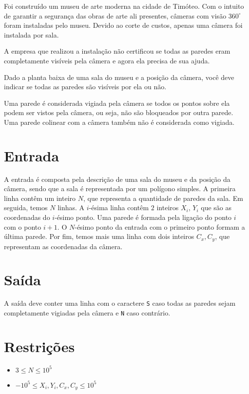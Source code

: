 Foi construído um museu de arte moderna na cidade de Timóteo. Com o intuito de garantir a segurança das obras
de arte ali presentes, câmeras com visão $360 ^{\circ}$ foram instaladas pelo museu.
Devido ao corte de custos, apenas uma câmera foi instalada por sala.

A empresa que realizou a instalação não certificou se todas as paredes eram completamente visíveis pela câmera e agora ela precisa de sua ajuda.

Dado a planta baixa de uma sala do museu e a posição da câmera, você deve indicar se todas as paredes são visíveis por ela ou não.

Uma parede é considerada vigiada pela câmera se todos os pontos sobre ela podem ser vistos pela câmera, ou seja, não são bloqueados por outra parede.
Uma parede colinear com a câmera também não é considerada como vigiada.


\section*{Entrada}

A entrada é composta pela descrição de uma sala do museu e da posição da câmera, sendo que a sala é
representada por um polígono simples.
A primeira linha contêm um inteiro $N$, que representa a quantidade de paredes da sala.
Em seguida, temos $N$ linhas. A $i$-ésima linha contêm $2$ inteiros $X_i$, $Y_i$ que são as coordenadas do $i$-ésimo ponto.
Uma parede é formada pela ligação do ponto $i$ com o ponto $i+1$. O $N$-ésimo ponto da entrada com o primeiro ponto formam a última parede.
Por fim, temos mais uma linha com dois inteiros $C_x, C_y$, que representam as coordenadas da câmera.

\section*{Saída}

A saída deve conter uma linha com o caractere \texttt{S} caso todas as paredes sejam completamente vigiadas pela câmera e \texttt{N} caso contrário.

\section*{Restrições}

\begin{itemize}
    \item $3 \leq N \leq 10^5 $
    \item $-10^5 \leq X_i, Y_i, C_x, C_y \leq 10^5 $
\end{itemize}

